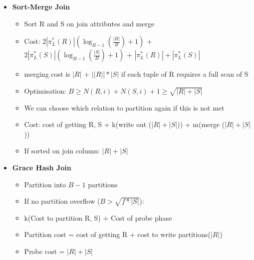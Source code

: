 \documentclass[10pt, landscape]{article}
\begin{document}
\begin{multicols}{4}
\begin{multicols}{2}
\begin{itemize}
      \item \textbf{Sort-Merge Join} \newline
      \begin{itemize}
        \item Sort R and S on join attributes and merge
        \item Cost: $2|\pi^*_L(R)|(\log_{B-1}(\frac{|R|}{B})+1)$ + $2|\pi^*_L(S)|(\log_{B-1}(\frac{|S|}{B})+1)$ + $|\pi^*_L(R)|+|\pi^*_L(S)|$
        \item merging cost is $|R|$ + $||R||*|S|$ if each tuple of R requires a full scan of S
        \item Optimisation: $B \ge N(R,i) + N(S,i) + 1 \ge \sqrt{|R|+|S|}$ 
        \item We can choose which relation to partition again if this is not met
        \item Cost: cost of getting R, S + k(write out ($|R|+|S|$)) + m(merge ($|R|+|S|$))
        \item If sorted on join column: $|R|+|S|$
      \end{itemize}

      \item \textbf{Grace Hash Join} \newline
      \begin{itemize}
        \item Partition into $B-1$ partitions
        \item If no partition overflow ($B > \sqrt{f*|S|}$):
        \item k(Cost to partition R, S) + Cost of probe phase
        \item Partition cost = cost of getting R + cost to write partitions($|R|$)
        \item Probe cost = $|R| + |S|$
      \end{itemize}

    \end{itemize}
\end{multicols}



\end{multicols}
\end{document}

